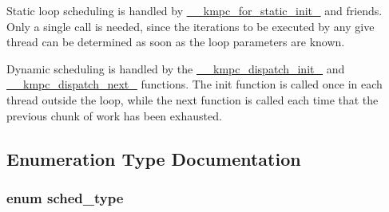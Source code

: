Static loop scheduling is handled by \hyperlink{group__WORK__SHARING_gab516cbd738ec072f4929faecbbc456f9}{\-\_\-\-\_\-kmpc\-\_\-for\-\_\-static\-\_\-init\-\_} and friends. Only a single call is needed, since the iterations to be executed by any give thread can be determined as soon as the loop parameters are known.

Dynamic scheduling is handled by the \hyperlink{group__WORK__SHARING_gae991c61cbe8e2942fe1f757a65442b26}{\-\_\-\-\_\-kmpc\-\_\-dispatch\-\_\-init\-\_} and \hyperlink{group__WORK__SHARING_ga5671ff45051907f76cc3d214e1de854b}{\-\_\-\-\_\-kmpc\-\_\-dispatch\-\_\-next\-\_} functions. The init function is called once in each thread outside the loop, while the next function is called each time that the previous chunk of work has been exhausted. 

\subsection{Enumeration Type Documentation}
\hypertarget{group__WORK__SHARING_gadcaf200537aaa0218a60c398438f81be}{
\subsubsection[{sched\-\_\-type}]{\setlength{\rightskip}{0pt plus 5cm}enum {\bf sched\-\_\-type}}}\label{group__WORK__SHARING_gadcaf200537aaa0218a60c398438f81be}
